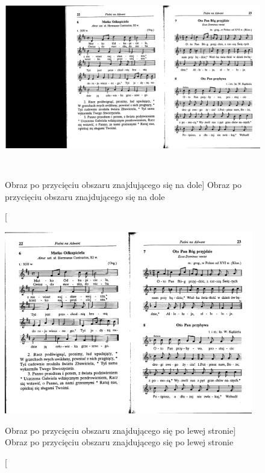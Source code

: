 \documentclass[a4paper,12pt]{article}
\begin{document}
    		    \begin{figure}[!ht]  
    			    \begin{center}
    				    \includegraphics[height=8cm, frame]{image//exampleImage//002_b.png} 
    			    \end{center}
    			    \caption
            			[Obraz po przycięciu obszaru znajdującego się na dole]  
        			    {Obraz po przycięciu obszaru znajdującego się na dole}  
    		    \end{figure}
    			
    	        \begin{figure}[!ht]  
    			    \begin{center}
    				    \includegraphics[height=8cm, frame] {image//exampleImage//002_c.png}
    			    \end{center}
        			\caption
        			    [Obraz po przycięciu obszaru znajdującego się po lewej stronie]
        			    {Obraz po przycięciu obszaru znajdującego się po lewej stronie} 
    		    \end{figure}
			
\end{document}
